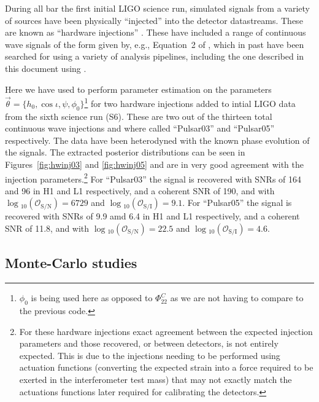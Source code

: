 During all bar the first initial LIGO science run, simulated signals from a variety of sources have been physically ``injected'' into the detector
datastreams. These are known as ``hardware injections'' \citep[see][for a general discussion of hardware injections, in particular relating to their
use, and extraction, in advanced LIGO's first obersving run]{2016arXiv161207864B}. These have included a range of continuous wave signals of the form given
by, e.g., Equation~2 of \citet{2017arXiv170107709T}, which in past have been searched for using a variety of analysis pipelines, including the one
described in this document using \lppe \citep[see, e.g., Appendix~B of][]{2007PhRvD..76d2001A}.

Here we have used \lppen to perform parameter estimation on the parameters $\vec{\theta} = \{h_0, \cos{\iota}, \psi, \phi_{0}\}$\footnote{$\phi_0$ is
being used here as opposed to $\Phi_{22}^C$ as we are not having to compare to the previous code.} for two hardware injections added to intial LIGO
data from the sixth science run (S6). These are two out of the thirteen total continuous wave injections and where called ``Pulsar03'' and ``Pulsar05''
respectively. The data have been heterodyned with the known phase evolution of the signals. The extracted posterior distributions can be seen in
Figures~\ref{fig:hwinj03} and \ref{fig:hwinj05} and are in very good agreement with the injection parameters.\footnote{For these hardware injections
exact agreement between the expected injection parameters and those recovered, or between detectors, is not entirely expected. This is due to the
injections needing to be performed using actuation functions (converting the expected \gw strain into a force required to be exerted in the
interferometer test mass) that may not exactly match the actuations functions later required for calibrating the detectors.} For ``Pulsar03''
the signal is recovered with SNRs of 164 and 96 in H1 and L1 respectively, and a coherent SNR of 190, and with
$\log{}_{10}\left(\mathcal{O}_{\text{S}/\text{N}}\right) = 6729$ and $\log{}_{10}\left(\mathcal{O}_{\text{S}/\text{I}}\right) = 9.1$. For ``Pulsar05''
the signal is recovered with SNRs of 9.9 amd 6.4 in H1 and L1 respectively, and a coherent SNR of 11.8, and with
$\log{}_{10}\left(\mathcal{O}_{\text{S}/\text{N}}\right) = 22.5$ and $\log{}_{10}\left(\mathcal{O}_{\text{S}/\text{I}}\right) = 4.6$.

\subsection{Monte-Carlo studies}

